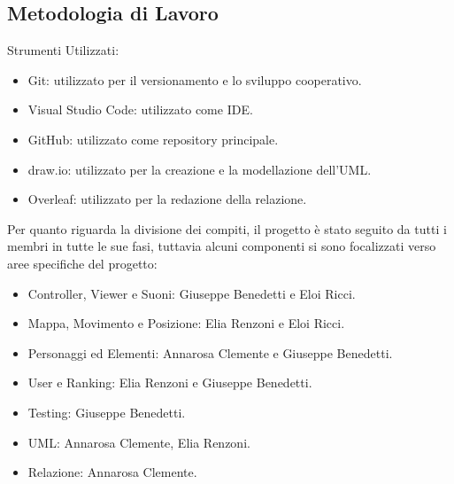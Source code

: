 \documentclass[12pt, letterpaper]{article}
\begin{document}
    \subsection{Metodologia di Lavoro}
        Strumenti Utilizzati: 
        \begin{itemize}
            \item Git: utilizzato per il versionamento e lo sviluppo cooperativo.
            \item Visual Studio Code: utilizzato come IDE.
            \item GitHub: utilizzato come repository principale.
            \item draw.io: utilizzato per la creazione e la modellazione dell'UML.
            \item Overleaf: utilizzato per la redazione della relazione.
        \end{itemize} 
        Per quanto riguarda la divisione dei compiti, il progetto è stato seguito da tutti i membri in tutte le sue fasi, tuttavia alcuni componenti si sono focalizzati verso aree specifiche del progetto:
        \begin{itemize}
            \item Controller, Viewer e Suoni: Giuseppe Benedetti e Eloi Ricci.
            \item Mappa, Movimento e Posizione: Elia Renzoni e Eloi Ricci.
            \item Personaggi ed Elementi: Annarosa Clemente e Giuseppe Benedetti.
            \item User e Ranking: Elia Renzoni e Giuseppe Benedetti.
            \item Testing: Giuseppe Benedetti.
            \item UML: Annarosa Clemente, Elia Renzoni.
            \item Relazione: Annarosa Clemente.
        \end{itemize}
    \newpage
\end{document}
